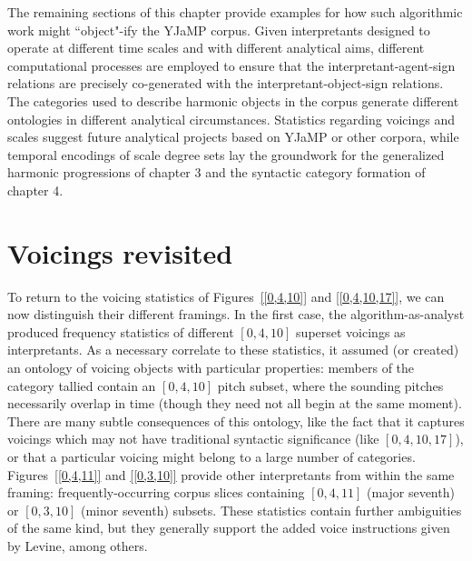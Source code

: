 The remaining sections of this chapter provide examples for how such algorithmic work might ``object"-ify the YJaMP corpus.  Given interpretants designed to operate at different time scales and with different analytical aims, different computational processes are employed to ensure that the interpretant-agent-sign relations are precisely co-generated with the interpretant-object-sign relations.  The categories used to describe harmonic objects in the corpus generate different ontologies in different analytical circumstances.  Statistics regarding voicings and scales suggest future analytical projects based on YJaMP or other corpora, while temporal encodings of scale degree sets lay the groundwork for the generalized harmonic progressions of chapter 3 and the syntactic category formation of chapter 4.
 
\section{Voicings revisited}
To return to the voicing statistics of Figures~\ref{[0,4,10]} and \ref{[0,4,10,17]}, we can now distinguish their different framings.  In the first case, the algorithm-as-analyst produced frequency statistics of different $[0,4,10]$ superset voicings as interpretants.  As a necessary correlate to these statistics, it assumed (or created) an ontology of voicing objects with particular properties: members of the category tallied contain an $[0,4,10]$ pitch subset, where the sounding pitches necessarily overlap in time (though they need not all begin at the same moment).  There are many subtle consequences of this ontology, like the fact that it captures voicings which may not have traditional syntactic significance (like $[0,4,10,17]$), or that a particular voicing might belong to a large number of categories.  Figures~\ref{[0,4,11]} and \ref{[0,3,10]} provide other interpretants from within the same framing: frequently-occurring corpus slices containing $[0,4,11]$ (major seventh) or $[0,3,10]$ (minor seventh) subsets.  These statistics contain further ambiguities of the same kind, but they generally support the added voice instructions given by Levine, among others.

